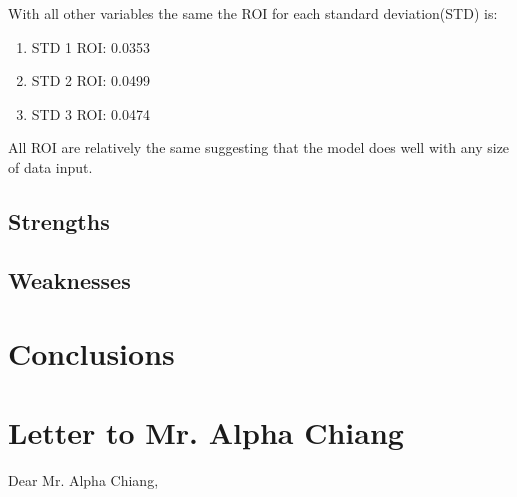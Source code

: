 \documentclass[12pt]{scrartcl}
\begin{document}
With all other variables the same the ROI for each standard deviation(STD) is:
\begin{enumerate}
\item STD 1 ROI: 0.0353
\item STD 2 ROI: 0.0499
\item STD 3 ROI: 0.0474
\end{enumerate}

All ROI are relatively the same suggesting that the model does well with any size of data input. 

\subsection{Strengths}
\subsection{Weaknesses}

\section{Conclusions}
\clearpage

\section{Letter to Mr. Alpha Chiang}
Dear Mr. Alpha Chiang,


\newpage
\end{document}
